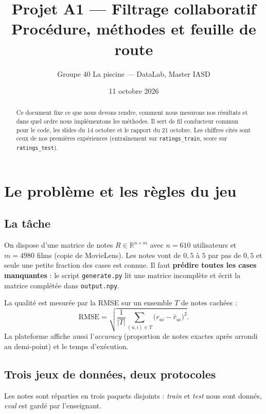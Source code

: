 \documentclass[11pt,a4paper]{article}
\title{\textbf{Projet A1 --- Filtrage collaboratif}\\[4pt]
  \large Procédure, méthodes et feuille de route}
\author{Groupe 40 \og La piscine \fg{} --- DataLab, Master IASD}
\date{11 octobre 2026}
\newcommand{\R}{\mathbb{R}}
\newcommand{\rhat}{\hat r}
\begin{document}
\maketitle

\begin{abstract}
\noindent Ce document fixe ce que nous devons rendre, comment nous mesurons nos
résultats et dans quel ordre nous implémentons les méthodes. Il sert de fil
conducteur commun pour le code, les slides du 14 octobre et le rapport du
21 octobre. Les chiffres cités sont ceux de nos premières expériences
(entraînement sur \texttt{ratings\_train}, score sur \texttt{ratings\_test}).
\end{abstract}

\tableofcontents
\newpage

\section{Le problème et les règles du jeu}

\subsection{La tâche}

On dispose d'une matrice de notes $R \in \R^{n \times m}$ avec $n = 610$
utilisateurs et $m = 4980$ films (copie de MovieLens). Les notes vont de $0{,}5$ à
$5$ par pas de $0{,}5$ et seule une petite fraction des cases est connue. Il faut
\textbf{prédire toutes les cases manquantes} : le script \texttt{generate.py}
lit une matrice incomplète et écrit la matrice complétée dans
\texttt{output.npy}.

La qualité est mesurée par la RMSE sur un ensemble $T$ de notes cachées :
\[
  \mathrm{RMSE} = \sqrt{\frac{1}{|T|} \sum_{(u,i) \in T} \bigl(r_{ui} - \rhat_{ui}\bigr)^2 } .
\]
La plateforme affiche aussi l'\emph{accuracy} (proportion de notes exactes après
arrondi au demi-point) et le temps d'exécution.

\subsection{Trois jeux de données, deux protocoles}

Les notes sont réparties en trois paquets disjoints : \emph{train} et \emph{test}
nous sont donnés, \emph{eval} est gardé par l'enseignant.
\end{document}
